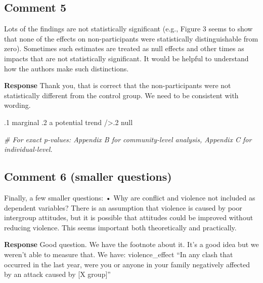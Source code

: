 \documentclass[
]{article}
\newenvironment{Shaded}{\begin{snugshade}}{\end{snugshade}}
\newcommand{\CommentTok}[1]{\textcolor[rgb]{0.56,0.35,0.01}{\textit{#1}}}
\newcommand{\DecValTok}[1]{\textcolor[rgb]{0.00,0.00,0.81}{#1}}
\newcommand{\FunctionTok}[1]{\textcolor[rgb]{0.00,0.00,0.00}{#1}}
\newcommand{\NormalTok}[1]{#1}
\newcommand{\SpecialCharTok}[1]{\textcolor[rgb]{0.00,0.00,0.00}{#1}}
\begin{document}
\hypertarget{comment-5}{%
\subsection{Comment 5}\label{comment-5}}

Lots of the findings are not statistically significant (e.g., Figure 3
seems to show that none of the effects on non-participants were
statistically distinguishable from zero). Sometimes such estimates are
treated as null effects and other times as impacts that are not
statistically significant. It would be helpful to understand how the
authors make such distinctions.

\textbf{Response} Thank you, that is correct that the non-participants
were not statistically different from the control group. We need to be
consistent with wording.

.1 marginal .2 a potential trend /\textgreater.2 null

\begin{Shaded}
\begin{Highlighting}[]
\CommentTok{\# For exact p{-}values: Appendix B for community{-}level analysis, Appendix C for individual{-}level.}
\end{Highlighting}
\end{Shaded}

\hypertarget{comment-6-smaller-questions}{%
\subsection{Comment 6 (smaller
questions)}\label{comment-6-smaller-questions}}

Finally, a few smaller questions: • Why are conflict and violence not
included as dependent variables? There is an assumption that violence is
caused by poor intergroup attitudes, but it is possible that attitudes
could be improved without reducing violence. This seems important both
theoretically and practically.

\textbf{Response} Good question. We have the footnote about it. It's a
good idea but we weren't able to measure that. We have: violence\_effect
``In any clash that occurred in the last year, were you or anyone in
your family negatively affected by an attack caused by {[}X group{]}''

\begin{Shaded}
\end{Shaded}
\end{document}
